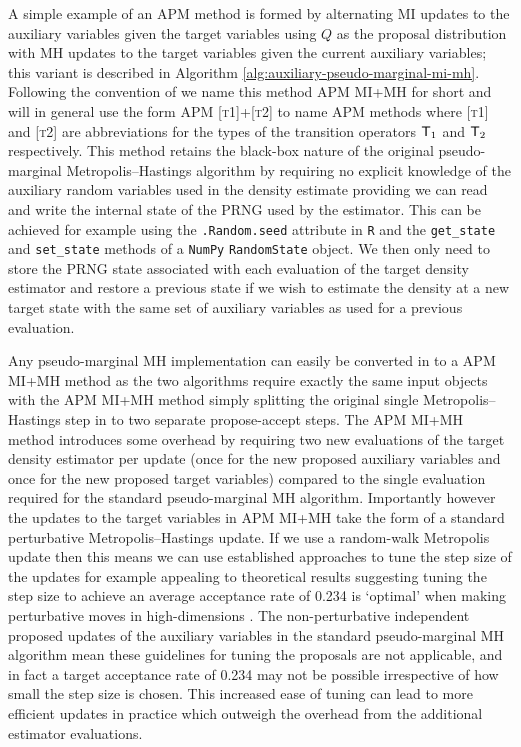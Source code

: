 A simple example of an \ac{APM} method is formed by alternating \ac{MI} updates to the auxiliary variables given the target variables using $Q$ as the proposal distribution with \ac{MH} updates to the target variables given the current auxiliary variables; this variant is described in Algorithm \ref{alg:auxiliary-pseudo-marginal-mi-mh}. Following the convention of \citep{murray2016pseudo} we name this method \ac{APM} \ac{MI}+\ac{MH} for short and will in general use the form \ac{APM} \textsc{[t1]}+\textsc{[t2]} to name \ac{APM} methods where \textsc{[t1]} and \textsc{[t2]} are abbreviations for the types of the transition operators $\mathsf{T}_1$ and $\mathsf{T}_2$ respectively. This method retains the black-box nature of the original pseudo-marginal Metropolis--Hastings algorithm by requiring no explicit knowledge of the auxiliary random variables used in the density estimate providing we can read and write the internal state of the \ac{PRNG} used by the estimator. This can be achieved for example using the \texttt{.Random.seed} attribute in \texttt{R} and the \texttt{get\_state} and \texttt{set\_state} methods of a \texttt{NumPy} \texttt{RandomState} object. We then only need to store the \ac{PRNG} state associated with each evaluation of the target density estimator and restore a previous state if we wish to estimate the density at a new target state with the same set of auxiliary variables as used for a previous evaluation.

Any pseudo-marginal \ac{MH} implementation can easily be converted in to a \ac{APM} \ac{MI}+\ac{MH} method as the two algorithms require exactly the same input objects with the \ac{APM} \ac{MI}+\ac{MH} method simply splitting the original single Metropolis--Hastings step in to two separate propose-accept steps. The \ac{APM} \ac{MI}+\ac{MH} method introduces some overhead by requiring two new evaluations of the target density estimator per update (once for the new proposed auxiliary variables and once for the new proposed target variables) compared to the single evaluation required for the standard pseudo-marginal \ac{MH} algorithm. Importantly however the updates to the target variables in \ac{APM} \ac{MI}+\ac{MH} take the form of a standard perturbative Metropolis--Hastings update. If we use a random-walk Metropolis update then this means we can use established approaches to tune the step size of the updates for example appealing to theoretical results suggesting tuning the step size to achieve an average acceptance rate of 0.234 is `optimal' when making perturbative moves in high-dimensions \citep{gelman1997weak}. The non-perturbative independent proposed updates of the auxiliary variables in the standard pseudo-marginal \ac{MH} algorithm mean these guidelines for tuning the proposals are not applicable, and in fact a target acceptance rate of 0.234 may not be possible irrespective of how small the step size is chosen. This increased ease of tuning can lead to more efficient updates in practice which outweigh the overhead from the additional estimator evaluations.

